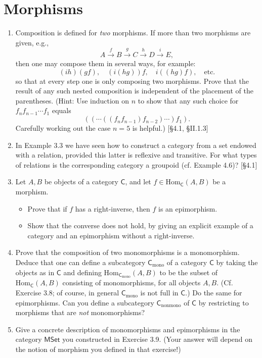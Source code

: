 \section{Morphisms}
\begin{enumerate}
    \item Composition is defined for \textit{two} morphisms. If more than two morphisms are given, e.g.,
    \[ A \xrightarrow{f} B \xrightarrow{g} C \xrightarrow{h} D \xrightarrow{i} E, \]
    then one may compose them in several ways, for example:
    \[ (ih)(gf), \quad (i(hg))f, \quad i((hg)f), \quad \text{etc.} \]
    so that at every step one is only composing two morphisms. Prove that the result of any such nested composition is independent of the placement of the parentheses. (Hint: Use induction on $n$ to show that any such choice for $f_n f_{n-1} \cdots f_1$ equals
    \[ ((\cdots((f_n f_{n-1}) f_{n-2}) \cdots) f_1). \]
    Carefully working out the case $n=5$ is helpful.) [\S4.1, \S II.1.3]

\item In Example 3.3 we have seen how to construct a category from a set endowed with a relation, provided this latter is reflexive and transitive. For what types of relations is the corresponding category a groupoid (cf. Example 4.6)? [\S4.1]

\item Let $A, B$ be objects of a category $\mathsf{C}$, and let $f \in \text{Hom}_{\mathsf{C}}(A, B)$ be a morphism.
    \begin{itemize}
        \item Prove that if $f$ has a right-inverse, then $f$ is an epimorphism.
        \item Show that the converse does not hold, by giving an explicit example of a category and an epimorphism without a right-inverse.
    \end{itemize}

\item Prove that the composition of two monomorphisms is a monomorphism. Deduce that one can define a subcategory $\mathsf{C}_{\text{mono}}$ of a category $\mathsf{C}$ by taking the objects as in $\mathsf{C}$ and defining $\text{Hom}_{\mathsf{C}_{\text{mono}}}(A, B)$ to be the subset of $\text{Hom}_{\mathsf{C}}(A, B)$ consisting of monomorphisms, for all objects $A, B$. (Cf. Exercise 3.8; of course, in general $\mathsf{C}_{\text{mono}}$ is not full in $\mathsf{C}$.) Do the same for epimorphisms. Can you define a subcategory $\mathsf{C}_{\text{nonmono}}$ of $\mathsf{C}$ by restricting to morphisms that are \textit{not} monomorphisms?

\item Give a concrete description of monomorphisms and epimorphisms in the category $\mathsf{MSet}$ you constructed in Exercise 3.9. (Your answer will depend on the notion of morphism you defined in that exercise!)
\end{enumerate}